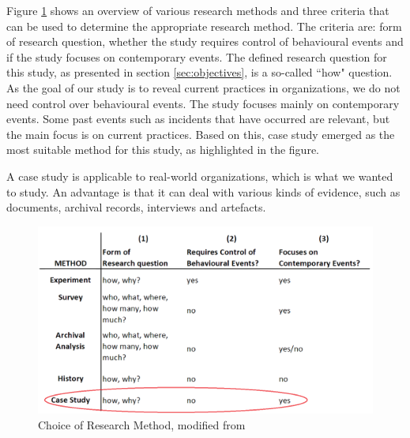 \label{sec:choiceOfMethod}
Figure \ref{fig:methods} shows an overview of various research methods and three criteria that can be used to determine the appropriate research method. The criteria are: form of research question, whether the study requires control of behavioural events and if the study focuses on contemporary events. The defined research question for this study, as presented in section \ref{sec:objectives}, is a so-called ``how" question. As the goal of our study is to reveal current practices in organizations, we do not need control over behavioural events. The study focuses mainly on contemporary events. Some past events such as incidents that have occurred are relevant, but the main focus is on current practices. Based on this, case study emerged as the most suitable method for this study, as highlighted in the figure.

A case study is applicable to real-world organizations, which is what we wanted to study. An advantage is that it can deal with various kinds of evidence, such as documents, archival records, interviews and artefacts.

\begin{figure}[h]
\begin{center}
\includegraphics[scale=0.35]{methods.png}
\caption[Choice of Research Method]{Choice of Research Method, modified from \cite{CaseStudyResearch}}
\label{fig:methods}
\end{center}
\end{figure}

